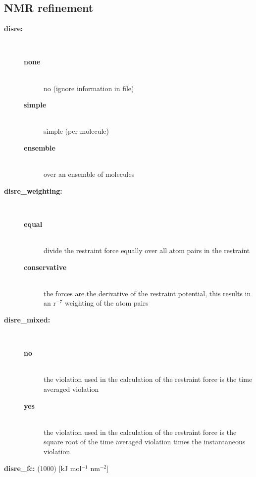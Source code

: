 \subsection{NMR refinement}
\begin{description}
\item[{\bf disre:}]\mbox{}\\
\vspace{-2ex}\begin{description}
\item[{\bf none}]\mbox{}\\
no  (ignore  information in
 file)
\item[{\bf simple}]\mbox{}\\
simple (per-molecule) 
\item[{\bf ensemble}]\mbox{}\\
 over an ensemble of molecules
\end{description}
\item[{\bf disre\_weighting:}]\mbox{}\\
\vspace{-2ex}\begin{description}
\item[{\bf equal}]\mbox{}\\
divide the restraint force equally over all atom pairs in the restraint
\item[{\bf conservative}]\mbox{}\\
the forces are the derivative of the restraint potential,
this results in an r$^{-7}$ weighting of the atom pairs
\end{description}
\item[{\bf disre\_mixed:}]\mbox{}\\
\vspace{-2ex}\begin{description}
\item[{\bf no}]\mbox{}\\
the violation used in the calculation of the restraint force is the
time averaged violation 
\item[{\bf yes}]\mbox{}\\
the violation used in the calculation of the restraint force is the
square root of the time averaged violation times the instantaneous violation 
\end{description}
\item[{\bf disre\_fc: }(1000) {[kJ mol$^{-1}$ nm$^{-2}$]}]\mbox{}\\

\end{description}
